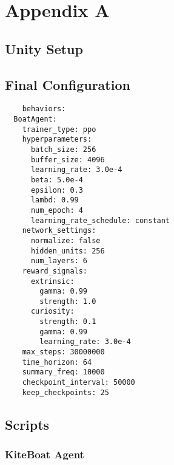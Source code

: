 %
%

\chapter{Appendix A}\label{app:app01}

\section{Unity Setup}\label{sec:unity_setup}

\section{Final Configuration}\label{config}
\begin{adjustbox}{width=\textwidth/2}
\begin{lstlisting}
    behaviors:
  BoatAgent:
    trainer_type: ppo
    hyperparameters:
      batch_size: 256
      buffer_size: 4096
      learning_rate: 3.0e-4
      beta: 5.0e-4
      epsilon: 0.3
      lambd: 0.99
      num_epoch: 4
      learning_rate_schedule: constant
    network_settings:
      normalize: false
      hidden_units: 256
      num_layers: 6
    reward_signals:
      extrinsic:
        gamma: 0.99
        strength: 1.0
      curiosity:
        strength: 0.1
        gamma: 0.99
        learning_rate: 3.0e-4
    max_steps: 30000000
    time_horizon: 64
    summary_freq: 10000
    checkpoint_interval: 50000
    keep_checkpoints: 25
\end{lstlisting}
\end{adjustbox}

\section{Scripts}

\subsection{KiteBoat Agent}\label{sec:kiteboat_agent}
\lstset{
  breaklines=true,   %
  breakatwhitespace=false,    %
}
\lstset{
  basicstyle=\ttfamily\small,
  breaklines=true
}
  
